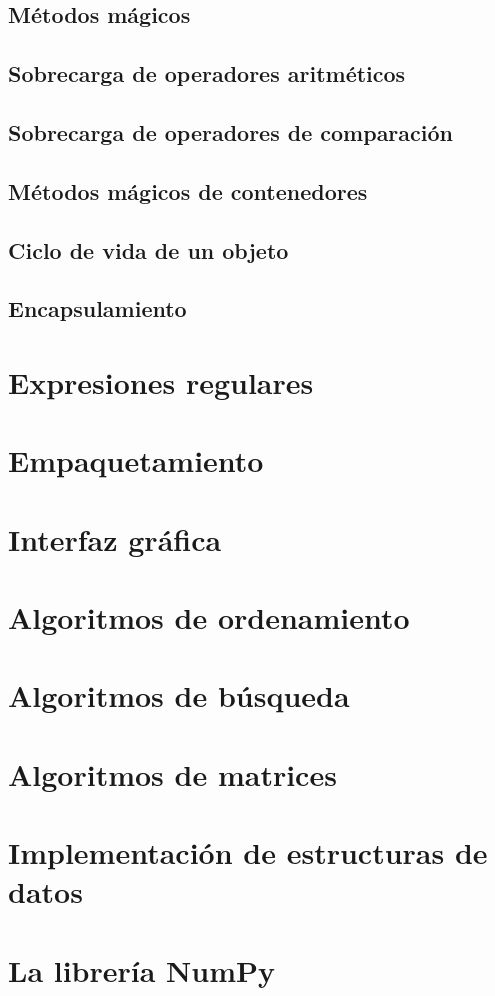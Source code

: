 \documentclass{report}
\begin{document}
\section{Métodos mágicos}

\section{Sobrecarga de operadores aritméticos}

\section{Sobrecarga de operadores de comparación}

\section{Métodos mágicos de contenedores}

\section{Ciclo de vida de un objeto}

\section{Encapsulamiento}

\clearpage\chapter{Expresiones regulares}

\clearpage\chapter{Empaquetamiento}

\clearpage\chapter{Interfaz gráfica}

\clearpage\chapter{Algoritmos de ordenamiento}

\clearpage\chapter{Algoritmos de búsqueda}

\clearpage\chapter{Algoritmos de matrices}

\clearpage\chapter{Implementación de estructuras de datos}

\clearpage\chapter{La librería NumPy}
\end{document}

